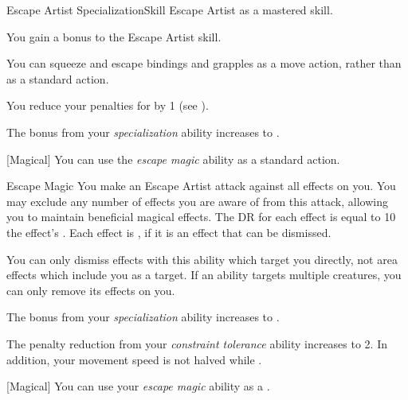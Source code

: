     \begin{feat}{Escape Artist Specialization}{Skill}
        \featpre Escape Artist as a mastered skill.

         You gain a  bonus to the Escape Artist skill.

         You can squeeze and escape bindings and grapples as a move action, rather than as a standard action.

         You reduce your penalties for  by 1 (see ).

         The bonus from your \textit{specialization} ability increases to .

        [Magical] You can use the \textit{escape magic} ability as a standard action.
        \begin{apability}{Escape Magic}
            You make an Escape Artist attack against all  effects on you.
            You may exclude any number of effects you are aware of from this attack, allowing you to maintain beneficial magical effects.
            The DR for each effect is equal to 10 \add the effect's .
            \hit Each effect is , if it is an effect that can be dismissed.
        \end{apability}

        You can only dismiss effects with this ability which target you directly, not area effects which include you as a target.
        If an ability targets multiple creatures, you can only remove its effects on you.

         The bonus from your \textit{specialization} ability increases to .

         The penalty reduction from your \textit{constraint tolerance} ability increases to 2.
        In addition, your movement speed is not halved while .

        [Magical] You can use your \textit{escape magic} ability as a .
    \end{feat}

